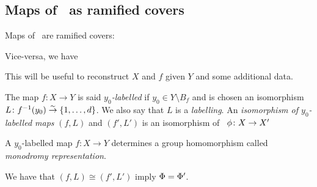 \documentclass[10pt]{beamer}
\begin{document}

\subsection{Maps of \rss\ as ramified covers}

\begin{frame}

Maps of \rss\ are ramified covers:


Vice-versa, we have


This will be useful to reconstruct $X$ and $f$ given $Y$ and some additional data.

\end{frame}


\begin{frame}

\begin{definition}
	The map $f\colon X\to Y$ is said \emph{$y_0$-labelled} if $y_0\in Y\setminus B_f$ and is chosen an isomorphism $L\colon f^{-1}(y_0)\overset\sim\to \{1,\ldots,d\}$. We also say that $L$ is a \emph{labelling}. An \emph{isomorphism of $y_0$-labelled maps} $(f,L)$ and $(f',L')$ is an isomorphism of \rss\ $\phi\colon X\to X'$ \st 
\end{definition}

\begin{definition}
	A $y_0$-labelled map $f\colon X\to Y$ determines a group homomorphism 
	called \emph{monodromy representation}.
\end{definition}

We have that $(f,L)\cong(f',L')$ imply $\Phi=\Phi'$.

\end{frame}
\end{document}
